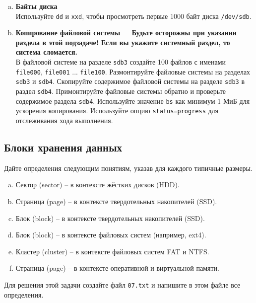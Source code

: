 \documentclass{article}
\begin{document}
\begin{enumerate}[(a)]
\item \textbf{Байты диска}\\
Используйте \texttt{dd} и \texttt{xxd}, чтобы просмотреть первые 1000 байт диска \texttt{/dev/sdb}.

\item \textbf{Копирование файловой системы} ~~ \textbf{Будьте осторожны при указании раздела в этой подзадаче! Если вы укажите системный раздел, то система сломается.}\\
В файловой системе на разделе \texttt{sdb3} создайте 100 файлов с именами \texttt{file000}, \texttt{file001} ... \texttt{file100}. Размонтируйте файловые системы на разделах \texttt{sdb3} и \texttt{sdb4}. Скопируйте содержимое файловой системы на разделе \texttt{sdb3} в раздел \texttt{sdb4}. Примонтируйте файловые системы обратно и проверьте содержимое раздела \texttt{sdb4}. Используйте значение \texttt{bs} как минимум 1 МиБ для ускорения копирования. Используйте опцию \texttt{status=progress} для отслеживания хода выполнения.
\end{enumerate}

\subsection{Блоки хранения данных}
Дайте определения следующим понятиям, указав для каждого типичные размеры.
\begin{enumerate}[(a)]
\item Сектор (sector) -- в контексте жёстких дисков (HDD).
\item Страница (page) -- в контексте твердотельных накопителей (SSD).
\item Блок (block) -- в контексте твердотельных накопителей (SSD).
\item Блок (block) -- в контексте файловых систем (например, ext4).
\item Кластер (cluster) -- в контексте файловых систем FAT и NTFS.
\item Страница (page) -- в контексте оперативной и виртуальной памяти.
\end{enumerate}
Для решения этой задачи создайте файл \texttt{07.txt} и напишите в этом файле все определения.
\end{document}
